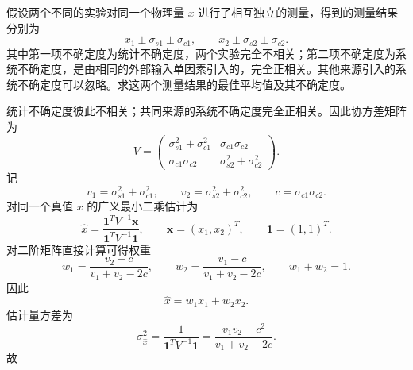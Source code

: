 \begin{question}
假设两个不同的实验对同一个物理量 $x$ 进行了相互独立的测量，得到的测量结果分别为
\[
x_1\pm\sigma_{s1}\pm\sigma_{c1},
\qquad
x_2\pm\sigma_{s2}\pm\sigma_{c2}.
\]
其中第一项不确定度为统计不确定度，两个实验完全不相关；第二项不确定度为系统不确定度，是由相同的外部输入单因素引入的，完全正相关。其他来源引入的系统不确定度可以忽略。求这两个测量结果的最佳平均值及其不确定度。
\begin{solution}
统计不确定度彼此不相关；共同来源的系统不确定度完全正相关。因此协方差矩阵为
\[
V=\begin{pmatrix}
\sigma_{s1}^2+\sigma_{c1}^2 & \sigma_{c1}\sigma_{c2}\\
\sigma_{c1}\sigma_{c2} & \sigma_{s2}^2+\sigma_{c2}^2
\end{pmatrix}.
\]
记
\[
v_1=\sigma_{s1}^2+\sigma_{c1}^2,
\qquad
v_2=\sigma_{s2}^2+\sigma_{c2}^2,
\qquad
c=\sigma_{c1}\sigma_{c2}.
\]
对同一个真值 $x$ 的广义最小二乘估计为
\[
\hat x=\frac{\mathbf 1^{T}V^{-1}\mathbf x}{\mathbf 1^{T}V^{-1}\mathbf 1},
\qquad
\mathbf x=(x_1,x_2)^T,
\qquad
\mathbf 1=(1,1)^T.
\]
对二阶矩阵直接计算可得权重
\[
w_1=\frac{v_2-c}{v_1+v_2-2c},
\qquad
w_2=\frac{v_1-c}{v_1+v_2-2c},
\qquad
w_1+w_2=1.
\]
因此
\[
\hat x=w_1x_1+w_2x_2.
\]
估计量方差为
\[
\sigma_{\hat x}^2=\frac{1}{\mathbf 1^{T}V^{-1}\mathbf 1}
=\frac{v_1v_2-c^2}{v_1+v_2-2c}.
\]
故
\end{solution}
\end{question}

